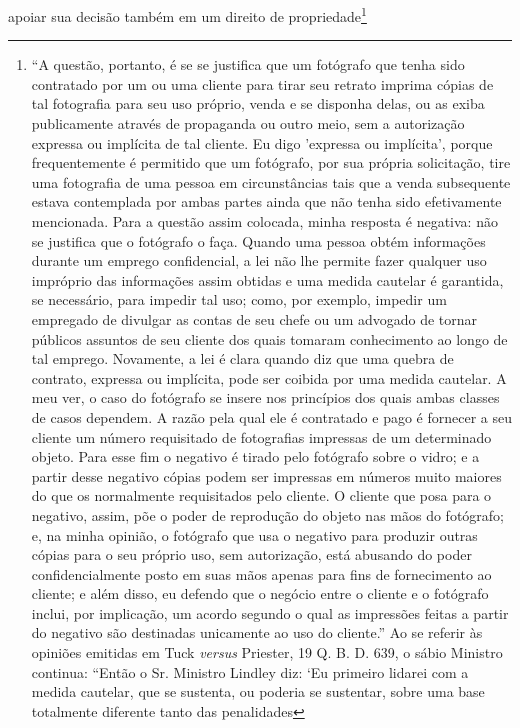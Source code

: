apoiar sua decisão também em um direito de propriedade\footnote{``A
  questão, portanto, é se se justifica que um fotógrafo que tenha sido
  contratado por um ou uma cliente para tirar seu retrato imprima cópias
  de tal fotografia para seu uso próprio, venda e se disponha delas, ou
  as exiba publicamente através de propaganda ou outro meio, sem a
  autorização expressa ou implícita de tal cliente. Eu digo 'expressa ou
  implícita', porque frequentemente é permitido que um fotógrafo, por
  sua própria solicitação, tire uma fotografia de uma pessoa em
  circunstâncias tais que a venda subsequente estava contemplada por
  ambas partes ainda que não tenha sido efetivamente mencionada. Para a
  questão assim colocada, minha resposta é negativa: não se justifica
  que o fotógrafo o faça. Quando uma pessoa obtém informações durante um
  emprego confidencial, a lei não lhe permite fazer qualquer uso
  impróprio das informações assim obtidas e uma medida cautelar é
  garantida, se necessário, para impedir tal uso; como, por exemplo,
  impedir um empregado de divulgar as contas de seu chefe ou um advogado
  de tornar públicos assuntos de seu cliente dos quais tomaram
  conhecimento ao longo de tal emprego. Novamente, a lei é clara quando
  diz que uma quebra de contrato, expressa ou implícita, pode ser
  coibida por uma medida cautelar. A meu ver, o caso do fotógrafo se
  insere nos princípios dos quais ambas classes de casos dependem. A
  razão pela qual ele é contratado e pago é fornecer a seu cliente um
  número requisitado de fotografias impressas de um determinado objeto.
  Para esse fim o negativo é tirado pelo fotógrafo sobre o vidro; e a
  partir desse negativo cópias podem ser impressas em números muito
  maiores do que os normalmente requisitados pelo cliente. O cliente que
  posa para o negativo, assim, põe o poder de reprodução do objeto nas
  mãos do fotógrafo; e, na minha opinião, o fotógrafo que usa o negativo
  para produzir outras cópias para o seu próprio uso, sem autorização,
  está abusando do poder confidencialmente posto em suas mãos apenas
  para fins de fornecimento ao cliente; e além disso, eu defendo que o
  negócio entre o cliente e o fotógrafo inclui, por implicação, um
  acordo segundo o qual as impressões feitas a partir do negativo são
  destinadas unicamente ao uso do cliente.'' Ao se referir às opiniões
  emitidas em Tuck \emph{versus} Priester, 19 Q. B. D. 639, o sábio
  Ministro continua: ``Então o Sr. Ministro Lindley diz: `Eu primeiro
  lidarei com a medida cautelar, que se sustenta, ou poderia se
  sustentar, sobre uma base totalmente diferente tanto das penalidades
}
